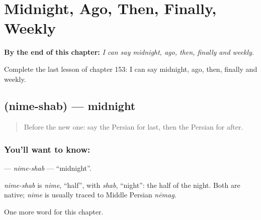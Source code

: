 
\chapter{Midnight, Ago, Then, Finally, Weekly}
\label{ch:fa-midnight-ago-then-finally-weekly}

\begin{chapteropening}
\textbf{By the end of this chapter:} \emph{I can say midnight, ago, then, finally and weekly.}

Complete the last lesson of chapter 153: I can say midnight, ago, then, finally and weekly.
\end{chapteropening}

\section[\texorpdfstring{\fa{نیمه} \fa{شب} (nime-shab)}{نیمه شب (nime-shab)}]{  (nime-shab) — midnight}

\label{lesson:FA-C153-nime-shab}



\begin{quote}
Before the new one: say the Persian for last, then the Persian for after.
\end{quote}

\subsection*{You'll want to know:  }
\textbf{ } — \emph{nime-shab} — \textquotedblleft{}midnight\textquotedblright{}.

\begin{cousinweb}
\emph{nime-shab} is \emph{nime}, \textquotedblleft{}half\textquotedblright{}, with \emph{shab}, \textquotedblleft{}night\textquotedblright{}: the half of the night. Both are native; \emph{nime} is usually traced to Middle Persian \emph{nēmag}.
\end{cousinweb}

\begin{grammarlens}[title={What you've built}]
One more word for this chapter.
\end{grammarlens}

